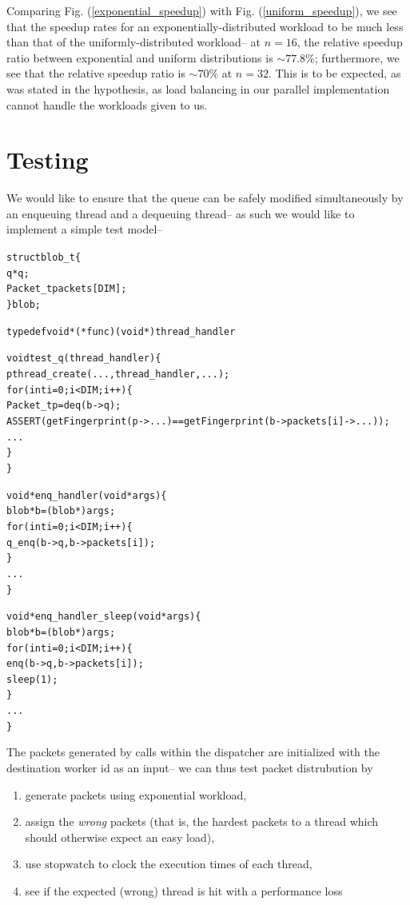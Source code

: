 \documentclass{article}
\newcommand{\figref}[1]{Fig. (\ref{#1})}
\newcommand{\ti}[1]{\emph{#1}}
\newcommand{\cpart}[1]{\newblock{\LARGE {\\\\#1}}}
\newcommand{\code}[1]{\texttt{$\text{#1}$}}
\begin{document}
Comparing \figref{exponential_speedup} with \figref{uniform_speedup}, we see that the speedup rates for an exponentially-distributed workload to be much less than 
that of the uniformly-distributed workload-- at $n = 16$, the relative speedup ratio between exponential and uniform distributions is $\sim77.8\%$; furthermore, we 
see that the relative speedup ratio is $\sim70\%$ at $n = 32$. This is to be expected, as was stated in the hypothesis, as load balancing in our parallel implementation cannot 
handle the workloads given to us.

\section{Testing}

\cpart{Queue Integrity}

We would like to ensure that the queue can be safely modified simultaneously by an enqueuing thread and a dequeuing thread-- as such we would like to implement a 
simple test model--

\begin{alltt}
struct blob_t \{
  q *q;
  Packet_t packets[DIM];
\} blob;

typedef void *(*func) (void *) thread_handler

void test_q(thread_handler) \{
  pthread_create(..., thread_handler, ...);
  for(int i = 0; i < DIM; i++) \{
    Packet_t p = deq(b->q);
    ASSERT(getFingerprint(p->...) == getFingerprint(b->packets[i]->...));
    ...
  \}
\}

void *enq_handler(void *args) \{
  blob *b = (blob *) args;
  for(int i = 0; i < DIM; i++) \{
    q_enq(b->q, b->packets[i]);
  \}
  ...
\}

void *enq_handler_sleep(void *args) \{
  blob *b = (blob *) args;
  for(int i = 0; i < DIM; i++) \{
    enq(b->q, b->packets[i]);
    sleep(1);
  \}
  ...
\}
\end{alltt}

\cpart{Packet Distribution}

The packets generated by calls within the dispatcher are initialized with the destination worker id as an input-- we can thus test packet distrubution by
\begin{enumerate}
	\item generate packets using exponential workload,
	\item assign the \ti{wrong} packets (that is, the hardest packets to a thread which should otherwise expect an easy load),
	\item use \code{stopwatch} to clock the execution times of each thread,
	\item see if the expected (wrong) thread is hit with a performance loss
\end{enumerate}
\end{document}
